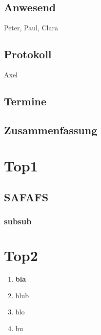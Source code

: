 \subsection*{Anwesend}

Peter, Paul, Clara

\subsection*{Protokoll}

Axel

\subsection*{Termine}

\subsection*{Zusammenfassung}

\tableofcontents

\hypertarget{top1}{%
\section{Top1}\label{top1}}

\Blindtext[1][3]

\hypertarget{safafs}{%
\subsection{SAFAFS}\label{safafs}}

\Blindtext[2][7]

\hypertarget{subsub}{%
\subsubsection{subsub}\label{subsub}}

\Blindtext[2][5]

\hypertarget{top2}{%
\section{Top2}\label{top2}}

\begin{enumerate}
\def\labelenumi{\arabic{enumi}.}
\item
  \textbf{bla} \Blindtext[1][5]
\item
  blub
\item
  blo
\item
  bu
\end{enumerate}


